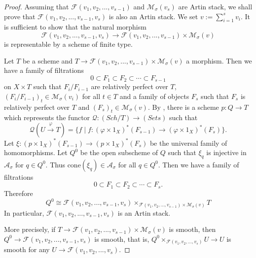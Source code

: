 \documentclass[leqno,11pt]{amsart}
\theoremstyle{definition}
\def\AA{\ensuremath{\mathcal A}}
\def\FF{\ensuremath{\mathcal F}}
\def\MM{\ensuremath{\mathcal M}}
\def\QQ{\ensuremath{\mathcal Q}}
\def\cal{\mathcal}
\begin{document}
\begin{proof}
Assuming that ${\cal F}(v_1,v_2,...,v_{s-1})$ and
${\cal M}_{\sigma}(v_s)$ are Artin stack,
we shall prove that 
${\cal F}(v_1,v_2,...,v_{s-1},v_s)$ is also an Artin stack.
We set $v:=\sum_{i=1}^s v_i$.
It is sufficient to show that the natural morphism
\begin{equation}
\FF(v_1,v_2,...,v_{s-1},v_s) \to 
\FF(v_1,v_2,...,v_{s-1}) \times \MM_{\sigma}(v)
\end{equation}
is representable by a scheme of finite type.

Let $T$ be a scheme and 
$T \to \FF(v_1,v_2,...,v_{s-1}) \times \MM_{\sigma}(v)$
a morphism. Then
we have a family of filtrations
\begin{equation}
0 \subset F_1 \subset F_2 \subset \cdots \subset F_{s-1}
\end{equation} 
on $X \times T$
such that $F_i/F_{i-1}$ are relatively perfect over $T$, 
$(F_i/F_{i-1})_t \in \MM_{\sigma}(v_i)$ for all $t \in T$ 
and a family of objects $F_s$ such that
$F_s$ is relatively perfect over $T$ and
$(F_s)_t \in \MM_{\sigma}(v)$.
By \cite[Prop. 1.1]{Ina02},
there is a scheme $p:Q \to T$ 
which represents the functor $\QQ:(Sch/T) \to (Sets)$ such that 
\begin{equation}
\QQ(U \overset{\varphi}{\to} T)=
\{f \mid f:(\varphi \times 1_X)^*(F_{s-1}) \to (\varphi \times 1_X)^*(F_s)\}.
\end{equation}
Let 
$\xi:(p \times 1_X)^*(F_{s-1}) \to (p \times 1_X)^*(F_s)$
be the universal family of homomorphisms.
Let $Q^0$ be the open subscheme
of $Q$ such that $\xi_q$ is injective in $\AA_{\sigma}$
for $q \in Q^0$.
Thus $\mathrm{cone}(\xi_q) \in \AA_{\sigma}$ for all $q \in Q^0$. 
Then we have a family of filtrations
\begin{equation}
0 \subset F_1 \subset F_2 \subset \cdots \subset F_s.
\end{equation} 
Therefore
\begin{equation}
Q^0 \cong \FF(v_1,v_2,...,v_{s-1},v_s) 
\times_{\FF(v_1,v_2,...,v_{s-1}) \times \MM_{\sigma}(v)}
T
\end{equation}
In particular, $\FF(v_1,v_2,...,v_{s-1},v_s)$ is an Artin stack.


More precisely, if
$T \to \FF(v_1,v_2,...,v_{s-1}) \times \MM_{\sigma}(v)$ is smooth,
then $Q^0 \to \FF(v_1,v_2,...,v_{s-1},v_s)$ is smooth,
that is,
$Q^0 \times_{\FF(v_1,v_2,...,v_s)} U \to U$ is smooth for any
$U \to \FF(v_1,v_2,...,v_s)$. 


\end{proof}
\end{document}
